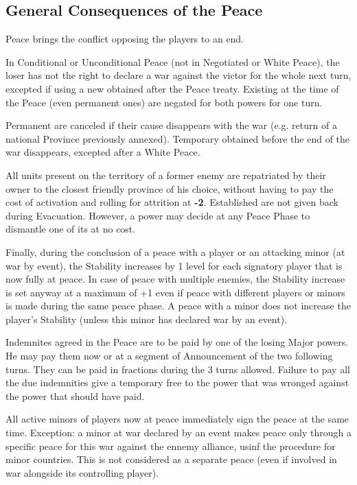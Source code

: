 \subsection{General Consequences of the Peace}

\aparag Peace brings the conflict opposing the players to an end.

\aparag In Conditional or Unconditional Peace (not in Negotiated or White
Peace), the loser has not the right to declare a war against the victor for
the whole next turn, excepted if using a new \CB obtained after the Peace
treaty.  Existing \CB at the time of the Peace (even permanent ones) are
negated for both powers for one turn.

Permanent \CB are canceled if their cause disappears with the war (e.g.
return of a national Province previously annexed). Temporary \CB obtained
before the end of the war disappears, excepted after a White Peace.

All units present on the territory of a former enemy are repatriated by their
owner to the closest friendly province of his choice, without having to pay
the cost of activation and rolling for attrition at {\bf -2}.
\bparag Established \Presidios are not given back during Evacuation.
\bparag However, a power may decide at any Peace Phase to dismantle one of its
\Presidios at no cost.

Finally, during the conclusion of a peace with a player or an attacking minor
(at war by event), the Stability increases by 1 level for each signatory
player that is now fully at peace.
\bparag In case of peace with multiple enemies, the Stability increase is set
anyway at a maximum of +1 even if peace with different players or minors is
made during the same peace phase.
\bparag A peace with a minor does not increase the player's Stability (unless
this minor has declared war by an event).

\aparag[Indemnities] Indemnites agreed in the Peace are to be paid by one of
the losing Major powers. He may pay them now or at a segment of Announcement
of the two following turns. They can be paid in fractions during the 3 turns
allowed.
\bparag Failure to pay all the due indemnities give a temporary free \CB to
the power that was wronged against the power that should have paid.

All active minors of players now at peace immediately sign the peace at the
same time.
\bparag
Exception: a minor at war declared by an event makes peace only through a
specific peace for this war against the ennemy alliance, usinf the procedure
for minor countries.  This is not considered as a separate peace (even if
involved in war alongside its controlling player).



